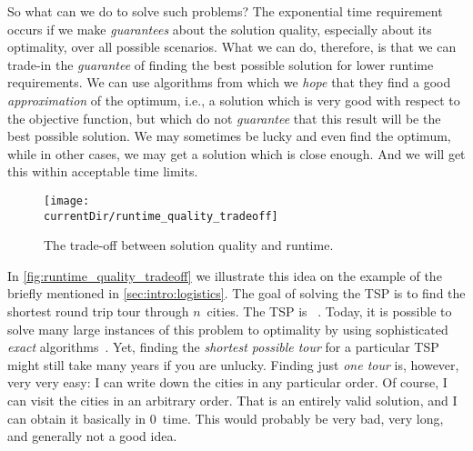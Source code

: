 So what can we do to solve such problems?
The exponential time requirement occurs if we make \emph{guarantees} about the solution quality, especially about its optimality, over all possible scenarios.
What we can do, therefore, is that we can trade-in the \emph{guarantee} of finding the best possible solution for lower runtime requirements.
We can use algorithms from which we \emph{hope} that they find a good \emph{approximation} of the optimum, i.e., a solution which is very good with respect to the objective function, but which do not \emph{guarantee} that this result will be the best possible solution.
We may sometimes be lucky and even find the optimum, while in other cases, we may get a solution which is close enough.
And we will get this within acceptable time limits.

\begin{figure}%
\centering%
\texttt{[image: \\currentDir/runtime\_quality\_tradeoff]}%
\caption{The trade-off between solution quality and runtime.}%
\label{fig:runtime_quality_tradeoff}%
\end{figure}

In \autoref{fig:runtime_quality_tradeoff} we illustrate this idea on the example of the ~\cite{ABCC2006TTSPACS,LLRKS1985TTSPAGTOCO,GP2002TTSPAIV} briefly mentioned in \autoref{sec:intro:logistics}.
The goal of solving the TSP is to find the shortest round trip tour through $n$~cities.
The TSP is \NPhard~\cite{GJ1979CAIAGTTTONC,GP2002TTSPAIV}. 
Today, it is possible to solve many large instances of this problem to optimality by using sophisticated \emph{exact} algorithms~\cite{CEG2007CWDPIFTSPT,C2021WT}.
Yet, finding the \emph{shortest possible tour} for a particular TSP might still take many years if you are unlucky.
Finding just \emph{one tour} is, however, very very easy:
I can write down the cities in any particular order.
Of course, I can visit the cities in an arbitrary order.
That is an entirely valid solution, and I can obtain it basically in 0~time.
This  would probably be very bad, very long, and generally not a good idea.

